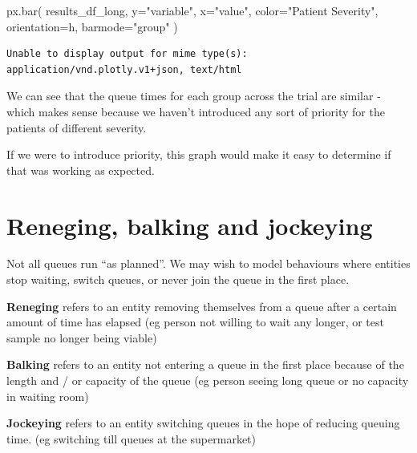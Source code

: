 \documentclass[
  letterpaper,
  DIV=11,
  numbers=noendperiod]{scrreprt}
\newenvironment{Shaded}{}{}
\newcommand{\NormalTok}[1]{\textcolor[rgb]{0.14,0.16,0.18}{#1}}
\newcommand{\OperatorTok}[1]{\textcolor[rgb]{0.14,0.16,0.18}{#1}}
\newcommand{\StringTok}[1]{\textcolor[rgb]{0.01,0.18,0.38}{#1}}
\begin{document}
\begin{Shaded}
\begin{Highlighting}[]
\NormalTok{px.bar(}
\NormalTok{    results\_df\_long,}
\NormalTok{    y}\OperatorTok{=}\StringTok{"variable"}\NormalTok{,}
\NormalTok{    x}\OperatorTok{=}\StringTok{"value"}\NormalTok{,}
\NormalTok{    color}\OperatorTok{=}\StringTok{"Patient Severity"}\NormalTok{,}
\NormalTok{    orientation}\OperatorTok{=}\StringTok{\textquotesingle{}h\textquotesingle{}}\NormalTok{,}
\NormalTok{    barmode}\OperatorTok{=}\StringTok{"group"}
\NormalTok{)}
\end{Highlighting}
\end{Shaded}

\begin{verbatim}
Unable to display output for mime type(s): application/vnd.plotly.v1+json, text/html
\end{verbatim}

We can see that the queue times for each group across the trial are
similar - which makes sense because we haven't introduced any sort of
priority for the patients of different severity.

If we were to introduce priority, this graph would make it easy to
determine if that was working as expected.

\chapter{Reneging, balking and
jockeying}\label{reneging-balking-and-jockeying}

Not all queues run ``as planned''. We may wish to model behaviours where
entities stop waiting, switch queues, or never join the queue in the
first place.

\textbf{Reneging} refers to an entity removing themselves from a queue
after a certain amount of time has elapsed (eg person not willing to
wait any longer, or test sample no longer being viable)

\textbf{Balking} refers to an entity not entering a queue in the first
place because of the length and / or capacity of the queue (eg person
seeing long queue or no capacity in waiting room)

\textbf{Jockeying} refers to an entity switching queues in the hope of
reducing queuing time. (eg switching till queues at the supermarket)
\end{document}
